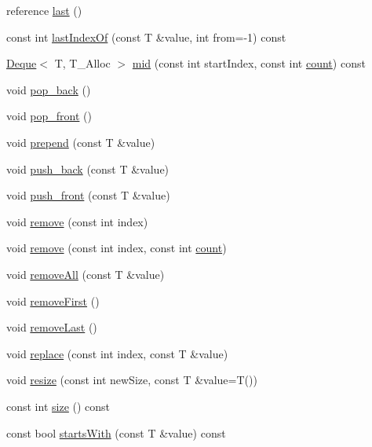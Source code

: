 \begin{DoxyCompactItemize}
\item 
reference \hyperlink{namespaceprism_abe4956c4e865f55ca126b7fb973b5078}{last} ()
\item 
const int \hyperlink{namespaceprism_af0ed081bf6c17e965bfac0d207cd6c28}{last\+Index\+Of} (const T \&value, int from=-\/1) const 
\item 
\hyperlink{namespaceprism_a8e77ed12f9b3a35d81935362d3050d0c}{Deque}$<$ T, T\+\_\+\+Alloc $>$ \hyperlink{namespaceprism_aeb39a03321ba086c660e96bfa11d33c4}{mid} (const int start\+Index, const int \hyperlink{namespaceprism_a024117fc3639cdf6598509edf22f034a}{count}) const 
\item 
void \hyperlink{namespaceprism_a682dc15d5493595804b4cf818b16281d}{pop\+\_\+back} ()
\item 
void \hyperlink{namespaceprism_a407f71f548b4930e7880b44cd695b33d}{pop\+\_\+front} ()
\item 
void \hyperlink{namespaceprism_ac5a9a7c94d57bb61f25a61ef10d74b80}{prepend} (const T \&value)
\item 
void \hyperlink{namespaceprism_aae03a861ef55e15b5a64c5cb2a727667}{push\+\_\+back} (const T \&value)
\item 
void \hyperlink{namespaceprism_a9a451a8db591d6c4fc315b05f9bff515}{push\+\_\+front} (const T \&value)
\item 
void \hyperlink{namespaceprism_a5b180b06c92cd65b70d2e565878e5d06}{remove} (const int index)
\item 
void \hyperlink{namespaceprism_a2a67eb6dd63f426b2837aebb07940b0b}{remove} (const int index, const int \hyperlink{namespaceprism_a024117fc3639cdf6598509edf22f034a}{count})
\item 
void \hyperlink{namespaceprism_a91a96073d835746d48ba0a145c33b29e}{remove\+All} (const T \&value)
\item 
void \hyperlink{namespaceprism_a32a0d96bc03a45529e399cd39c48cb66}{remove\+First} ()
\item 
void \hyperlink{namespaceprism_a7dd774edd9e5b7398334440070da6bdd}{remove\+Last} ()
\item 
void \hyperlink{namespaceprism_acac76605957b60675b2859cef694c61f}{replace} (const int index, const T \&value)
\item 
void \hyperlink{namespaceprism_a7236cdb4e2661bd63c2fe4ee5c3452f9}{resize} (const int new\+Size, const T \&value=T())
\item 
const int \hyperlink{namespaceprism_acd3c0f96adf158a29387191d79c4d874}{size} () const 
\item 
const bool \hyperlink{namespaceprism_a92e90ca54b9fa627213076f93d44ca2d}{starts\+With} (const T \&value) const 

\end{DoxyCompactItemize}
